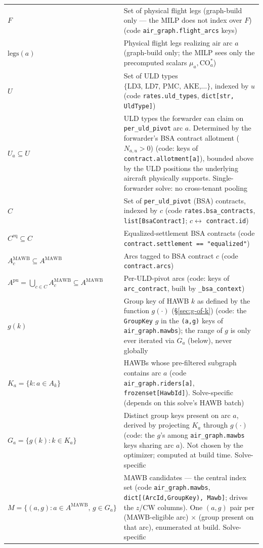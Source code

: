 \documentclass[11pt,a4paper]{article}
\theoremstyle{definition}
\begin{document}
\begin{table}[H]
\begin{tabular}{lp{11.5cm}}
$F$ & Set of physical flight legs (graph-build only --- the MILP does not index over $F$) (code \texttt{air\_graph.flight\_arcs} keys) \\
$\text{legs}(a)$ & Physical flight legs realizing air arc $a$ (graph-build only; the MILP sees only the precomputed scalars $\mu_a, \text{CO}_a^*$) \\
$U$ & Set of ULD types $\{\text{LD3, LD7, PMC, AKE,} \ldots\}$, indexed by $u$ (code \texttt{rates.uld\_types}, \texttt{dict[str, UldType]}) \\
$U_a \subseteq U$ & ULD types the forwarder can claim on \texttt{per\_uld\_pivot} arc $a$. Determined by the forwarder's BSA contract allotment ($N_{a,u} > 0$) (code: keys of \texttt{contract.allotment[a]}), bounded above by the ULD positions the underlying aircraft physically supports. Single-forwarder solve: no cross-tenant pooling \\
$C$ & Set of \texttt{per\_uld\_pivot} (BSA) contracts, indexed by $c$ (code \texttt{rates.bsa\_contracts}, \texttt{list[BsaContract]}; $c \leftrightarrow$ \texttt{contract.id}) \\
$C^{\text{eq}} \subseteq C$ & Equalized-settlement BSA contracts (code \texttt{contract.settlement == "equalized"}) \\
$A_c^{\text{MAWB}} \subseteq A^{\text{MAWB}}$ & Arcs tagged to BSA contract $c$ (code \texttt{contract.arcs}) \\
$A^{\text{pu}} = \bigcup_{c \in C} A_c^{\text{MAWB}} \subseteq A^{\text{MAWB}}$ & Per-ULD-pivot arcs (code: keys of \texttt{arc\_contract}, built by \texttt{\_bsa\_context}) \\
$g(k)$ & Group key of HAWB $k$ as defined by the function $g(\cdot)$ (\S\ref{sec:g-of-k}) (code: the \texttt{GroupKey} $g$ in the \texttt{(a,g)} keys of \texttt{air\_graph.mawbs}); the range of $g$ is only ever iterated via $G_a$ (below), never globally \\
$K_a = \{k : a \in A_k\}$ & HAWBs whose pre-filtered subgraph contains arc $a$ (code \texttt{air\_graph.riders[a]}, \texttt{frozenset[HawbId]}). Solve-specific (depends on this solve's HAWB batch) \\
$G_a = \{g(k) : k \in K_a\}$ & Distinct group keys present on arc $a$, derived by projecting $K_a$ through $g(\cdot)$ (code: the $g$'s among \texttt{air\_graph.mawbs} keys sharing arc $a$). Not chosen by the optimizer; computed at build time. Solve-specific \\
$M = \{(a, g) : a \in A^{\text{MAWB}},\, g \in G_a\}$ & MAWB candidates --- the central index set (code \texttt{air\_graph.mawbs}, \texttt{dict[(ArcId,GroupKey), Mawb]}; drives the $z$/$\text{CW}$ columns). One $(a, g)$ pair per (MAWB-eligible arc) $\times$ (group present on that arc), enumerated at build. Solve-specific \\

\end{tabular}
\end{table}
\end{document}
